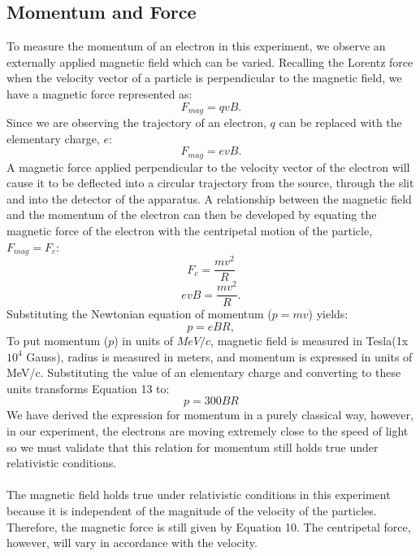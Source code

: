 \subsection{Momentum and Force}
To measure the momentum of an electron in this experiment, we observe an externally applied magnetic field which can be varied. Recalling the Lorentz force when the velocity vector of a particle is perpendicular to the magnetic field, we have a magnetic force represented as:
\begin{equation} F_{mag}=qvB. \end {equation}
Since we are observing the trajectory of an electron, $q$ can be replaced with the elementary charge, $e$: 
\begin{equation} F_{mag}=evB.\end{equation}
A magnetic force applied perpendicular to the velocity vector of the electron will cause it to be deflected into a circular trajectory from the source, through the slit and into the detector of the apparatus. A relationship between the magnetic field and the momentum of the electron can then be developed by equating the magnetic force of the electron with the centripetal motion of the particle,$F_{mag}=F_c$:
\begin{equation} F_c=\frac{mv^2}{R}\end{equation}
\begin{equation} evB=\frac{mv^2}{R}.\end {equation}
Substituting the Newtonian equation of momentum ($p=mv$) yields:
\begin{equation}p=eBR,\end{equation}
To put momentum ($p$) in units of $MeV/c$, magnetic field is measured in Tesla(1x$10^4$ Gauss), radius is measured in meters, and momentum is expressed in units of MeV/c. Substituting the value of an elementary charge and converting to these units transforms Equation 13 to:
\begin{equation} p=300BR\end{equation}
We have derived the expression for momentum in a purely classical way, however, in our experiment, the electrons are moving extremely close to the speed of light so we must validate that this relation for momentum still holds true under relativistic conditions.
\\
\\
The magnetic field holds true under relativistic conditions in this experiment because it is independent of the magnitude of the velocity of the particles. Therefore, the magnetic force is still given by Equation 10. The centripetal force, however, will vary in accordance with the velocity. 
